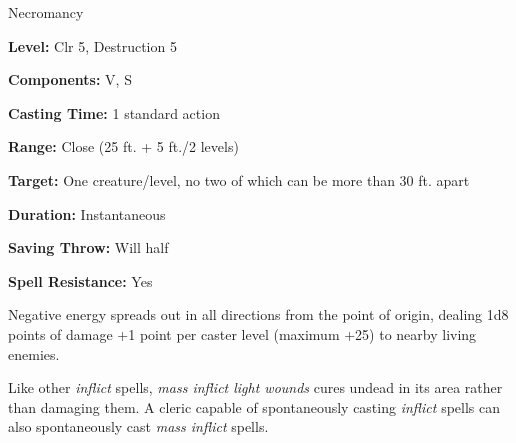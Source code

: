 \label{spell:Mass Inflict Light Wounds}

Necromancy

\textbf{Level:} Clr 5, Destruction 5

\textbf{Components:} V, S

\textbf{Casting Time:} 1 standard action

\textbf{Range:} Close (25 ft. + 5 ft./2 levels)

\textbf{Target:} One creature/level, no two of which can be more than 30 ft. apart

\textbf{Duration:} Instantaneous

\textbf{Saving Throw:} Will half

\textbf{Spell Resistance:} Yes

Negative energy spreads out in all directions from the point of origin, dealing 
1d8 points of damage +1 point per caster level (maximum +25) to nearby living enemies.

Like other \textit{inflict} spells, \textit{mass inflict light wounds} cures undead 
in its area rather than damaging them. A cleric capable of spontaneously casting 
\textit{inflict} spells can also spontaneously cast \textit{mass inflict} spells.

